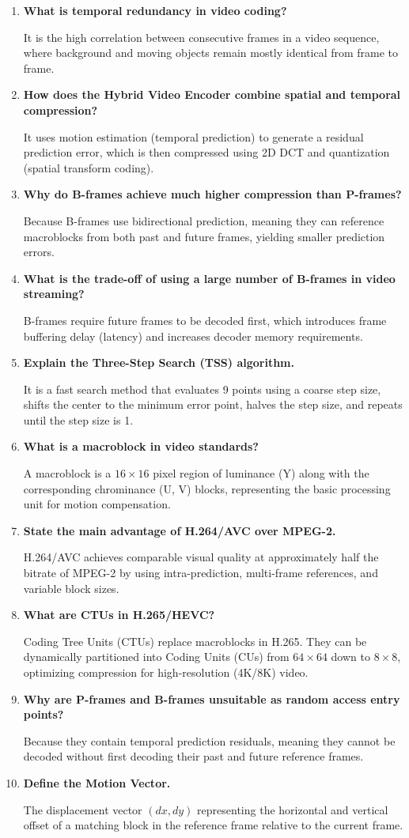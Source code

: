 \documentclass[12pt,a4paper]{article}
\newcommand{\Q}[1]{\textbf{#1}\par\noindent\ignorespaces}
\begin{document}
\begin{tcolorbox}[exambox, title={\textbf{Frequently Asked / Viva Questions}}]
\begin{enumerate}[leftmargin=*, itemsep=3.5pt, label=\arabic*.]
  \item \Q{What is temporal redundancy in video coding?} It is the high correlation between consecutive frames in a video sequence, where background and moving objects remain mostly identical from frame to frame.
  \item \Q{How does the Hybrid Video Encoder combine spatial and temporal compression?} It uses motion estimation (temporal prediction) to generate a residual prediction error, which is then compressed using 2D DCT and quantization (spatial transform coding).
  \item \Q{Why do B-frames achieve much higher compression than P-frames?} Because B-frames use bidirectional prediction, meaning they can reference macroblocks from both past and future frames, yielding smaller prediction errors.
  \item \Q{What is the trade-off of using a large number of B-frames in video streaming?} B-frames require future frames to be decoded first, which introduces frame buffering delay (latency) and increases decoder memory requirements.
  \item \Q{Explain the Three-Step Search (TSS) algorithm.} It is a fast search method that evaluates 9 points using a coarse step size, shifts the center to the minimum error point, halves the step size, and repeats until the step size is 1.
  \item \Q{What is a macroblock in video standards?} A macroblock is a $16 \times 16$ pixel region of luminance (Y) along with the corresponding chrominance (U, V) blocks, representing the basic processing unit for motion compensation.
  \item \Q{State the main advantage of H.264/AVC over MPEG-2.} H.264/AVC achieves comparable visual quality at approximately half the bitrate of MPEG-2 by using intra-prediction, multi-frame references, and variable block sizes.
  \item \Q{What are CTUs in H.265/HEVC?} Coding Tree Units (CTUs) replace macroblocks in H.265. They can be dynamically partitioned into Coding Units (CUs) from $64 \times 64$ down to $8 \times 8$, optimizing compression for high-resolution (4K/8K) video.
  \item \Q{Why are P-frames and B-frames unsuitable as random access entry points?} Because they contain temporal prediction residuals, meaning they cannot be decoded without first decoding their past and future reference frames.
  \item \Q{Define the Motion Vector.} The displacement vector $(dx, dy)$ representing the horizontal and vertical offset of a matching block in the reference frame relative to the current frame.
\end{enumerate}
\end{tcolorbox}
\end{document}
